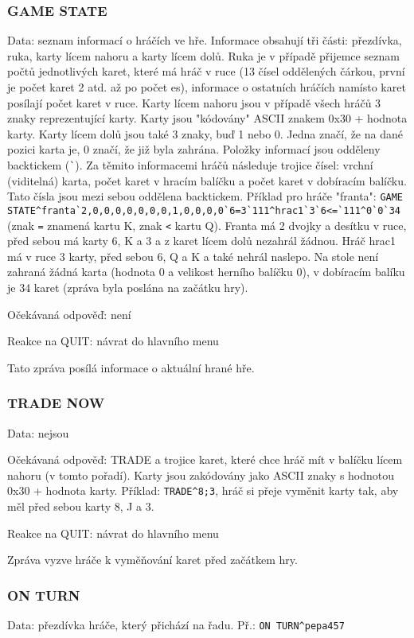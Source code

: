 \documentclass{article}
\begin{document}
\subsubsection{GAME STATE}
Data: seznam informací o hráčích ve hře. Informace obsahují tři části: přezdívka, ruka, karty lícem nahoru a karty lícem dolů. Ruka je v případě přijemce seznam počtů jednotlivých karet, které má hráč v ruce (13 čísel oddělených čárkou, první je počet karet 2 atd. až po počet es), informace o ostatních hráčích namísto karet posílají počet karet v ruce. Karty lícem nahoru jsou v případě všech hráčů 3 znaky reprezentující karty. Karty jsou "kódovány" ASCII znakem 0x30 + hodnota karty. Karty lícem dolů jsou také 3 znaky, buď 1 nebo 0. Jedna značí, že na dané pozici karta je, 0 značí, že již byla zahrána. Položky informací jsou odděleny backtickem (\verb|`|). Za těmito informacemi hráčů následuje trojice čísel: vrchní (viditelná) karta, počet karet v hracím balíčku a počet karet v dobíracím balíčku. Tato čísla jsou mezi sebou oddělena backtickem. Příklad pro hráče "franta": \verb|GAME STATE^franta`2,0,0,0,0,0,0,0,1,0,0,0,0`6=3`111^hrac1`3`6<=`111^0`0`34| (znak \verb|=| znamená kartu K, znak \verb|<| kartu Q). Franta má 2 dvojky a desítku v ruce, před sebou má karty 6, K a 3 a z karet lícem dolů nezahrál žádnou. Hráč hrac1 má v ruce 3 karty, před sebou 6, Q a K a také nehrál naslepo. Na stole není zahraná žádná karta (hodnota 0 a velikost herního balíčku 0), v dobíracím balíku je 34 karet (zpráva byla poslána na začátku hry).

Očekávaná odpověď: není 

Reakce na QUIT: návrat do hlavního menu

Tato zpráva posílá informace o aktuální hrané hře. 

\subsubsection{TRADE NOW}
Data: nejsou 

Očekávaná odpověď: TRADE a trojice karet, které chce hráč mít v balíčku lícem nahoru (v tomto pořadí). Karty jsou zakódovány jako ASCII znaky s hodnotou 0x30 + hodnota karty. Příklad: \verb|TRADE^8;3|, hráč si přeje vyměnit karty tak, aby měl před sebou karty 8, J a 3.

Reakce na QUIT: návrat do hlavního menu

Zpráva vyzve hráče k vyměňování karet před začátkem hry.

\subsubsection{ON TURN}
Data: přezdívka hráče, který přichází na řadu. Př.: \verb|ON TURN^pepa457| 
\end{document}
